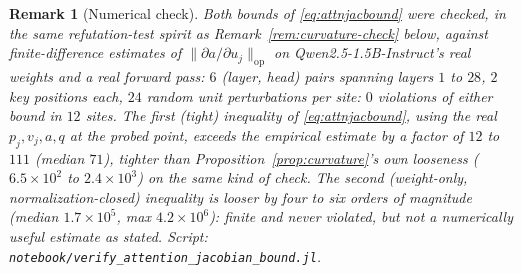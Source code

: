 \documentclass[11pt,a4paper]{article}
\newtheorem{remark}{Remark}
\begin{document}
\begin{remark}[Numerical check]
\label{rem:attnjacobian-check}
Both bounds of \eqref{eq:attnjacbound} were checked, in the same
refutation-test spirit as Remark~\ref{rem:curvature-check} below, against
finite-difference estimates of $\|\partial a/\partial u_j\|_{\mathrm{op}}$ on
Qwen2.5-1.5B-Instruct's real weights and a real forward pass: $6$
(layer, head) pairs spanning layers $1$ to $28$, $2$ key positions each, $24$
random unit perturbations per site: $0$ violations of either bound in
$12$ sites. The first (tight) inequality of \eqref{eq:attnjacbound}, using
the real $p_j,v_j,a,q$ at the probed point, exceeds the empirical estimate
by a factor of $12$ to $111$ (median $71$), tighter than
Proposition~\ref{prop:curvature}'s own looseness ($6.5\times10^2$ to
$2.4\times10^3$) on the same kind of check. The second (weight-only,
normalization-closed) inequality is looser by four to six orders of
magnitude (median $1.7\times10^5$, max $4.2\times10^6$): finite and never
violated, but not a numerically useful estimate as stated. Script:
\texttt{notebook/\allowbreak verify\_attention\_jacobian\_bound.jl}.
\end{remark}
\end{document}
